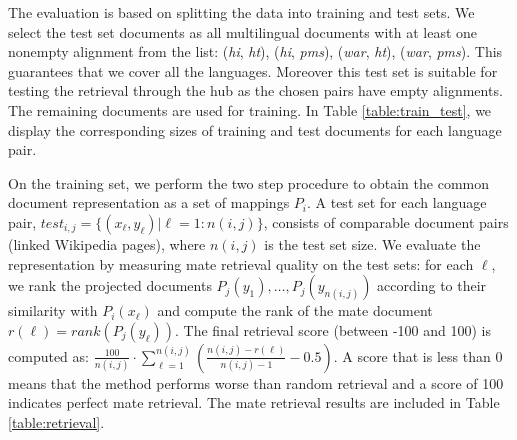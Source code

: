 \documentclass[twoside,11pt]{article}
\begin{document}
The evaluation is based on splitting the data into training and test sets. %
We select the test set documents as all multilingual documents with at least one nonempty alignment from the list: (\emph{hi}, \emph{ht}), (\emph{hi}, \emph{pms}), (\emph{war}, \emph{ht}), (\emph{war}, \emph{pms}). This guarantees that we cover all the languages. Moreover this test set is suitable for testing the retrieval through the hub as the chosen pairs have empty alignments. The remaining documents are used for training. In Table \ref{table:train_test}, we display the corresponding sizes of training and test documents for each language pair.

On the training set, we perform the two step procedure to obtain the common document representation as a set of mappings $P_i$. A test set for each language pair, $test_{i,j} = \{(x_\ell,y_\ell) | \ell = 1:n(i,j)\} $, consists of comparable document pairs (linked Wikipedia pages), where $n(i,j)$ is the test set size. We evaluate the representation by measuring mate retrieval quality on the test sets: for each $\ell$, we rank the projected documents $P_j(y_1),\ldots, P_j(y_{n(i,j)})$ according to their similarity with $P_i(x_\ell)$ and compute the rank of the mate document $r(\ell) = rank(P_j(y_\ell))$. The final retrieval score (between -100 and 100) is computed as: $\frac{100}{n(i,j)} \cdot \sum_{\ell = 1}^{n(i,j)} \left( \frac{n(i,j) - r(\ell)}{n(i,j) -1} -0.5\right)$. A score that is less than 0 means that the method performs worse than random retrieval and a score of 100 indicates perfect mate retrieval. The mate retrieval results are included in Table \ref{table:retrieval}.
\end{document}
